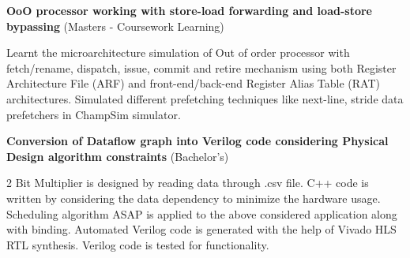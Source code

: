\documentclass[letterpaper,11pt]{article}
\begin{document}
\begin{itemize}[leftmargin=0in, label={}]
{{    \textbf{OoO processor working with store-load forwarding and load-store bypassing} \hspace{\fill} (Masters - Coursework Learning)
     \vspace{-10 pt}
     \begin{justify} Learnt the microarchitecture simulation of Out of order processor with fetch/rename, dispatch, issue, commit and retire mechanism using both Register Architecture File (ARF) and front-end/back-end Register Alias Table (RAT) architectures. Simulated different prefetching techniques like next-line, stride data prefetchers in ChampSim simulator.
     \end{justify} 
     \vspace{1 pt}
     
     \textbf{Conversion of Dataflow graph into Verilog code considering Physical Design algorithm constraints} \hspace{\fill} (Bachelor's)
     \vspace{-10 pt} 
     \begin{justify} 2 Bit Multiplier is designed by reading data through .csv file. C++ code is written by considering the data dependency to minimize the hardware usage. Scheduling algorithm ASAP is applied to the above considered application along with binding. Automated Verilog code is generated with the help of Vivado HLS RTL synthesis. Verilog code is tested for functionality.
     \end{justify} 
     \vspace{1 pt}
    

    }}
 \end{itemize}
\vspace{-12pt}



    
\end{document}
